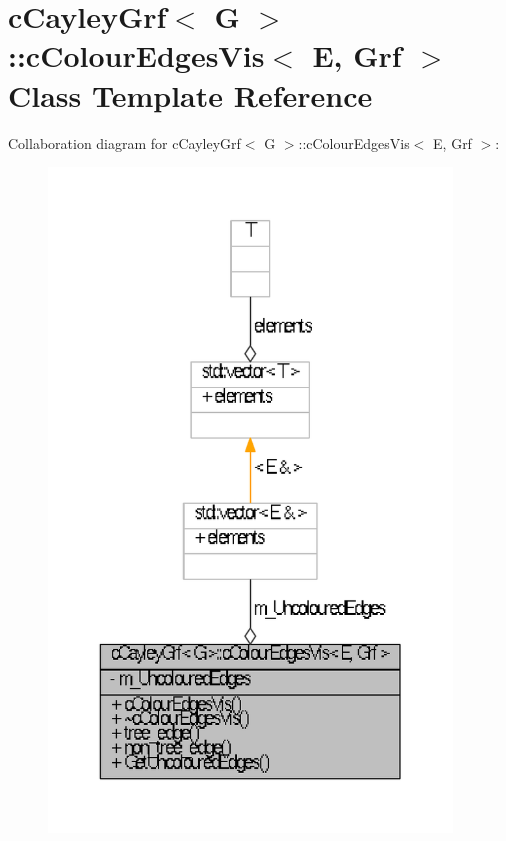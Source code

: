\hypertarget{classcCayleyGrf_1_1cColourEdgesVis}{\section{c\-Cayley\-Grf$<$ \-G $>$\-:\-:c\-Colour\-Edges\-Vis$<$ \-E, \-Grf $>$ \-Class \-Template \-Reference}
\label{classcCayleyGrf_1_1cColourEdgesVis}
}


\-Collaboration diagram for c\-Cayley\-Grf$<$ \-G $>$\-:\-:c\-Colour\-Edges\-Vis$<$ \-E, \-Grf $>$\-:
\nopagebreak
\begin{figure}[H]
\begin{center}
\leavevmode
\includegraphics[width=304pt]{classcCayleyGrf_1_1cColourEdgesVis__coll__graph}
\end{center}
\end{figure}
